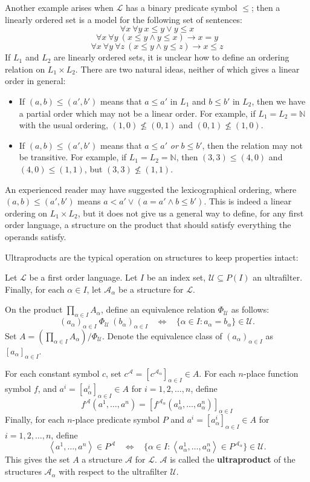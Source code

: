 \documentclass{article}
\def\A{\mathcal A}
\def\Lang{\mathcal L}
\def\U{\mathscr U}
\def\N{\mathbb N}
\begin{document}
Another example arises when $\Lang$ has a binary predicate symbol $\le$; then a linearly ordered set is a model for the following set of sentences:
$$\forall x~\forall y~x\le y\vee y\le x$$
$$\forall x~\forall y~(x\le y\wedge y\le x)\to x=y$$
$$\forall x~\forall y~\forall z~(x\le y\wedge y\le z)\to x\le z$$
If $L_1$ and $L_2$ are linearly ordered sets, it is unclear how to define an ordering relation on $L_1\times L_2$.  There are two natural ideas, neither of which gives a linear order in general:
\begin{itemize}
\item If $(a,b)\le(a',b')$ means that $a\le a'$ in $L_1$ and $b\le b'$ in $L_2$, then we have a partial order which may not be a linear order.  For example, if $L_1=L_2=\N$ with the usual ordering, $(1,0)\not\le(0,1)$ and $(0,1)\not\le(1,0)$.

\item If $(a,b)\le(a',b')$ means that $a\le a'$ \emph{or} $b\le b'$, then the relation may not be transitive.  For example, if $L_1=L_2=\N$, then $(3,3)\le(4,0)$ and $(4,0)\le(1,1)$, but $(3,3)\not\le(1,1)$.
\end{itemize}
An experienced reader may have suggested the lexicographical ordering, where $(a,b)\le(a',b')$ means $a<a'\vee(a=a'\wedge b\le b')$.  This is indeed a linear ordering on $L_1\times L_2$, but it does not give us a general way to define, for any first order language, a structure on the product that should satisfy everything the operands satisfy.

Ultraproducts are the typical operation on structures to keep properties intact:

\begin{definition}
Let $\Lang$ be a first order language.  Let $I$ be an index set, $\U\subseteq P(I)$ an ultrafilter.  Finally, for each $\alpha\in I$, let $\A_\alpha$ be a structure for $\Lang$.

On the product $\prod_{\alpha\in I}A_\alpha$, define an equivalence relation $\Phi_\U$ as follows:
$$(a_\alpha)_{\alpha\in I}~\Phi_\U~(b_\alpha)_{\alpha\in I}~~~~\iff~~~~\{\alpha\in I:a_\alpha=b_\alpha\}\in\U.$$
Set $A=\left(\prod_{\alpha\in I}A_\alpha\right)/\Phi_\U$.  Denote the equivalence class of $(a_\alpha)_{\alpha\in I}$ as $[a_\alpha]_{\alpha\in I}$.

For each constant symbol $c$, set $c^\A=[c^{\A_\alpha}]_{\alpha\in I}\in A$.  For each $n$-place function symbol $f$, and $a^i=[a^i_\alpha]_{\alpha\in I}\in A$ for $i=1,2,\dots,n$, define
$$f^\A(a^1,\dots,a^n)=[f^{\A_\alpha}(a^1_\alpha,\dots,a^n_\alpha)]_{\alpha\in I}$$
Finally, for each $n$-place predicate symbol $P$ and $a^i=[a^i_\alpha]_{\alpha\in I}\in A$ for $i=1,2,\dots,n$, define
$$\left<a^1,\dots,a^n\right>\in P^\A~~~~\iff~~~~\{\alpha\in I:\left<a^1_\alpha,\dots,a^n_\alpha\right>\in P^{\A_\alpha}\}\in\U.$$
This gives the set $A$ a structure $\A$ for $\Lang$.  $\A$ is called the \textbf{ultraproduct} of the structures $\A_\alpha$ with respect to the ultrafilter $\U$.
\end{definition}
\end{document}
